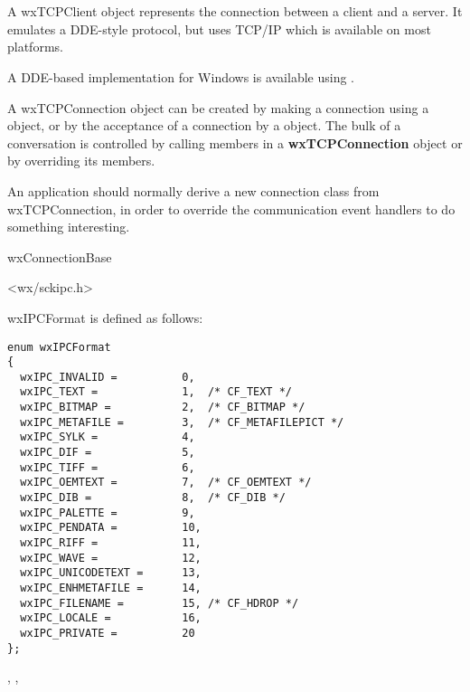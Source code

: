 \section{}\label{wxtcpconnection}

A wxTCPClient object represents the connection between a client and a server.
It emulates a DDE-style protocol, but uses TCP/IP which is available on most platforms.

A DDE-based implementation for Windows is available using .

A wxTCPConnection object can be created by making a connection using a\rtfsp
{} object, or by the acceptance of a connection by a\rtfsp
{} object. The bulk of a conversation is controlled by
calling members in a {\bf wxTCPConnection} object or by overriding its
members.

An application should normally derive a new connection class from
wxTCPConnection, in order to override the communication event handlers
to do something interesting.


wxConnectionBase\\


<wx/sckipc.h>


wxIPCFormat is defined as follows:

\begin{verbatim}
enum wxIPCFormat
{
  wxIPC_INVALID =          0,
  wxIPC_TEXT =             1,  /* CF_TEXT */
  wxIPC_BITMAP =           2,  /* CF_BITMAP */
  wxIPC_METAFILE =         3,  /* CF_METAFILEPICT */
  wxIPC_SYLK =             4,
  wxIPC_DIF =              5,
  wxIPC_TIFF =             6,
  wxIPC_OEMTEXT =          7,  /* CF_OEMTEXT */
  wxIPC_DIB =              8,  /* CF_DIB */
  wxIPC_PALETTE =          9,
  wxIPC_PENDATA =          10,
  wxIPC_RIFF =             11,
  wxIPC_WAVE =             12,
  wxIPC_UNICODETEXT =      13,
  wxIPC_ENHMETAFILE =      14,
  wxIPC_FILENAME =         15, /* CF_HDROP */
  wxIPC_LOCALE =           16,
  wxIPC_PRIVATE =          20
};
\end{verbatim}


, , 

